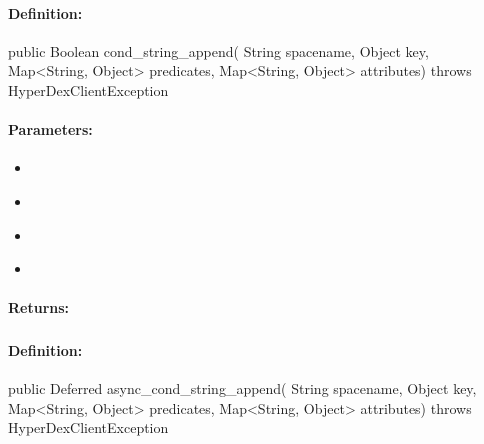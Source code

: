 \paragraph{Definition:}
\begin{javacode}
public Boolean cond_string_append(
        String spacename,
        Object key,
        Map<String, Object> predicates,
        Map<String, Object> attributes) throws HyperDexClientException
\end{javacode}

\paragraph{Parameters:}
\begin{itemize}[noitemsep]
\item {}\\

\item {}\\

\item {}\\

\item {}\\

\end{itemize}

\paragraph{Returns:}


\pagebreak
\subsubsection{}
\label{api:java:async_cond_string_append}


\paragraph{Definition:}
\begin{javacode}
public Deferred async_cond_string_append(
        String spacename,
        Object key,
        Map<String, Object> predicates,
        Map<String, Object> attributes) throws HyperDexClientException
\end{javacode}


